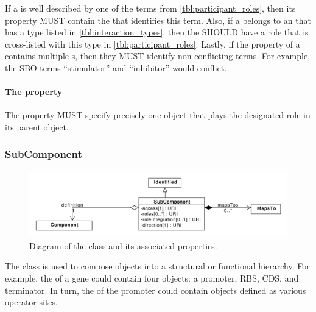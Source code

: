 If a  is well described by one of the terms from \ref{tbl:participant_roles}, then its  property MUST contain the  that identifies this term.
Also, if a  belongs to an  that has a type listed in \ref{tbl:interaction_types}, then the  SHOULD have a role that is cross-listed with this type in \ref{tbl:participant_roles}.
Lastly, if the  property of a  contains multiple
 s, then they MUST identify non-conflicting terms. For example, the SBO terms ``stimulator'' and ``inhibitor'' would conflict.


\paragraph{The  property}\label{sec:participant}

The  property MUST specify precisely one  object that plays the designated role in its parent  object.

\subsubsection{SubComponent}
\label{sec:SubComponent}

\begin{figure}[ht]
\begin{center}
\includegraphics[scale=0.6]{uml/subcomponent}
\caption[]{Diagram of the  class and its associated properties.}
\label{uml:subcomponent}
\end{center}
\end{figure}

The  class is used to compose  objects into a structural or functional hierarchy. For example, the  of a gene could contain four  objects: a promoter, RBS, CDS, and terminator. In turn, the  of the promoter  could contain  objects defined as various operator sites.

